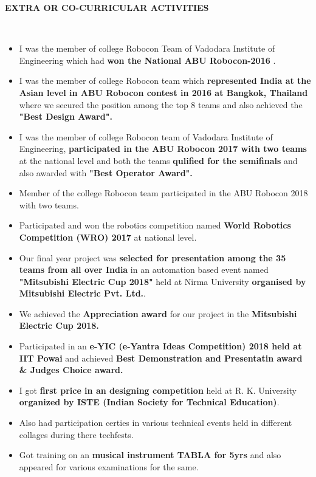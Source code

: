 \documentclass[a4paper,10pt]{article}
\newcommand{\lsep}{-0.5cm}
\newcommand{\resheading}[1]{{\small \colorbox{mygrey}{\begin{minipage}{0.975\textwidth}{\textbf{#1 \vphantom{p\^{E}}}}\end{minipage}}}}
\begin{document}
\resheading{\textbf{\Large{EXTRA OR CO-CURRICULAR ACTIVITIES}} }\\[\lsep]
\begin{itemize}
\item \noindent I was the member of college Robocon Team of Vadodara Institute of Engineering which had {\textbf{won the National ABU Robocon-2016} }.
\item \noindent I was the member of college Robocon team which \textbf{ represented India at the Asian level in ABU Robocon contest in 2016 at Bangkok, Thailand} where we secured the position among the top 8 teams and also achieved the \textbf{"Best Design Award".}
\item \noindent  I was the member of college Robocon team of Vadodara Institute of Engineering, \textbf{participated in the ABU Robocon 2017 with two teams} at the national level and both the teams \textbf{qulified for the semifinals} and also awarded with \textbf{"Best Operator Award".}
\item \noindent Member of the college Robocon team participated in the ABU Robocon 2018 with two teams.
\item \noindent Participated and won the robotics competition named {\textbf{World Robotics Competition (WRO) 2017}} at national level.
\item \noindent Our final year project was \textbf{selected for presentation among the 35 teams from all over India} in an automation based event named {\textbf{"Mitsubishi Electric Cup 2018"}} held at Nirma University \textbf{organised by Mitsubishi Electric Pvt. Ltd.}.
\item \noindent We achieved the \textbf{Appreciation award} for our project in the \textbf{Mitsubishi Electric Cup 2018.}
\item \noindent Participated in an \textbf{e-YIC (e-Yantra Ideas Competition) 2018 held at IIT Powai} and achieved \textbf{Best Demonstration and Presentatin award \& Judges Choice award.}
\item \noindent I got \textbf{first price in an designing competition} held at R. K. University \textbf{organized by ISTE (Indian Society for Technical Education)}.
\item \noindent Also had participation certies in various technical events held in different collages during there techfests.
\item \noindent Got training on an \textbf{musical instrument TABLA for 5yrs} and also appeared for various examinations for the same.
\end{itemize}
\end{document}
